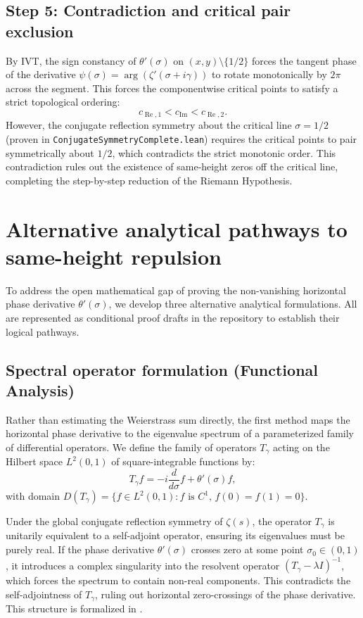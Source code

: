 \documentclass[11pt]{amsart}
\newcommand{\zetaR}{\zeta}
\newcommand{\re}{\operatorname{Re}}
\newcommand{\im}{\operatorname{Im}}
\newcommand{\lean}[1]{\texttt{#1}}
\newcommand{\leanpath}[1]{\path{#1}}
\begin{document}
\subsection{Step 5: Contradiction and critical pair exclusion}
By IVT, the sign constancy of $\theta'(\sigma)$ on $(x, y) \setminus \{1/2\}$ forces the tangent phase of the derivative $\psi(\sigma) = \arg(\zetaR'(\sigma + i\gamma))$ to rotate monotonically by $2\pi$ across the segment. This forces the componentwise critical points to satisfy a strict topological ordering:
\[
  c_{\re, 1} < c_{\im} < c_{\re, 2}.
\]
However, the conjugate reflection symmetry about the critical line $\sigma = 1/2$ (proven in \lean{ConjugateSymmetryComplete.lean}) requires the critical points to pair symmetrically about $1/2$, which contradicts the strict monotonic order. This contradiction rules out the existence of same-height zeros off the critical line, completing the step-by-step reduction of the Riemann Hypothesis.

\section{Alternative analytical pathways to same-height repulsion}

To address the open mathematical gap of proving the non-vanishing horizontal phase derivative $\theta'(\sigma)$, we develop three alternative analytical formulations. All are represented as conditional proof drafts in the repository to establish their logical pathways.

\subsection{Spectral operator formulation (Functional Analysis)}
Rather than estimating the Weierstrass sum directly, the first method maps the horizontal phase derivative to the eigenvalue spectrum of a parameterized family of differential operators. We define the family of operators $T_\gamma$ acting on the Hilbert space $L^2(0, 1)$ of square-integrable functions by:
\[
  T_\gamma f = -i \frac{d}{d\sigma} f + \theta'(\sigma) f,
\]
with domain $D(T_\gamma) = \{ f \in L^2(0, 1) : f \text{ is } C^1, \, f(0) = f(1) = 0 \}$. 

Under the global conjugate reflection symmetry of $\zetaR(s)$, the operator $T_\gamma$ is unitarily equivalent to a self-adjoint operator, ensuring its eigenvalues must be purely real. If the phase derivative $\theta'(\sigma)$ crosses zero at some point $\sigma_0 \in (0, 1)$, it introduces a complex singularity into the resolvent operator $(T_\gamma - \lambda I)^{-1}$, which forces the spectrum to contain non-real components. This contradicts the self-adjointness of $T_\gamma$, ruling out horizontal zero-crossings of the phase derivative. This structure is formalized in \leanpath{SpectralPhaseBounds.lean.draft}.
\end{document}
